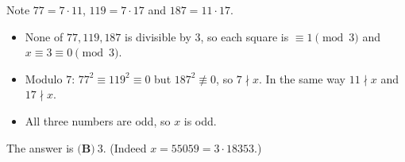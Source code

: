 Note $77=7\cdot11$, $119=7\cdot17$ and $187=11\cdot17$.
\begin{itemize}
\item None of $77,119,187$ is divisible by $3$, so each square is $\equiv1\pmod3$ and $x\equiv3\equiv0\pmod3$.
\item Modulo $7$: $77^2\equiv119^2\equiv0$ but $187^2\not\equiv0$, so $7\nmid x$. In the same way $11\nmid x$ and $17\nmid x$.
\item All three numbers are odd, so $x$ is odd.
\end{itemize}
The answer is $\boxed{\textbf{(B)}\ 3}$. (Indeed $x=55059=3\cdot18353$.)
